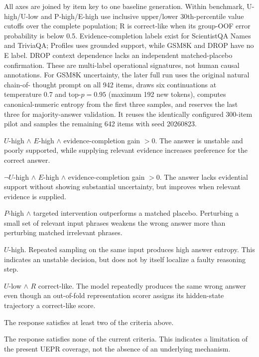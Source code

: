 All axes are joined by item key to one baseline generation. Within benchmark,
U-high/U-low and P-high/E-high use inclusive upper/lower 30th-percentile value
cutoffs over the complete population; R is correct-like when its group-OOF error
probability is below 0.5. Evidence-completion labels exist for ScientistQA Names
and TriviaQA; Profiles uses grounded support, while GSM8K and DROP have no E
label. DROP context dependence lacks an independent matched-placebo confirmation.
These are multi-label operational signatures, not human causal annotations.
For GSM8K uncertainty, the later full run uses the original natural chain-of-
thought prompt on all 942 items, draws six continuations at temperature 0.7 and
top-$p=0.95$ (maximum 192 new tokens), computes canonical-numeric entropy from
the first three samples, and reserves the last three for majority-answer
validation. It reuses the identically configured 300-item pilot and samples the
remaining 642 items with seed 20260823.

\begin{description}[leftmargin=0pt,labelindent=0pt,itemsep=2pt,topsep=3pt]
\item[Knowledge deficit.]
$U$-high $\wedge$ $E$-high $\wedge$ evidence-completion gain $>0$.
The answer is unstable and poorly supported, while supplying relevant evidence increases preference for the correct answer.

\item[Confident unsupported error.]
$\neg U$-high $\wedge$ $E$-high $\wedge$ evidence-completion gain $>0$.
The answer lacks evidential support without showing substantial uncertainty, but improves when relevant evidence is supplied.

\item[Context-induced local dependence.]
$P$-high $\wedge$ targeted intervention outperforms a matched placebo.
Perturbing a small set of relevant input phrases weakens the wrong answer more than perturbing matched irrelevant phrases.

\item[Reasoning instability.]
$U$-high.
Repeated sampling on the same input produces high answer entropy.  This indicates an unstable decision, but does not by itself localize a faulty reasoning step.

\item[Stable self-consistent error.]
$U$-low $\wedge$ $R$ correct-like.
The model repeatedly produces the same wrong answer even though an out-of-fold representation scorer assigns its hidden-state trajectory a correct-like score.

\item[Mixed.]
The response satisfies at least two of the criteria above.

\item[Unclassified.]
The response satisfies none of the current criteria.  This indicates a limitation of the present UEPR coverage, not the absence of an underlying mechanism.
\end{description}

